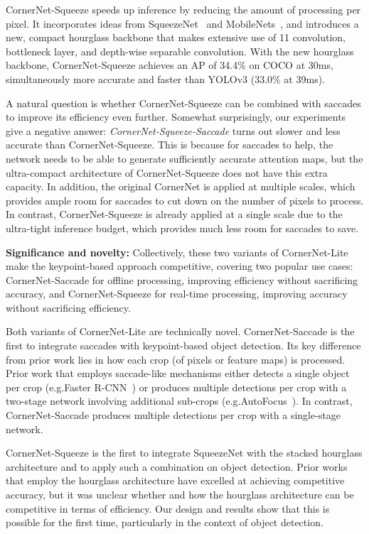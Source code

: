\documentclass{bmvc2k}
\begin{document}
CornerNet-Squeeze speeds up inference by reducing the amount of processing per pixel. It incorporates ideas from SqueezeNet~\cite{iandola2016squeezenet} and MobileNets~\cite{howard2017mobilenets}, and introduces a new, compact hourglass backbone that makes extensive use of 11 convolution, bottleneck layer, and depth-wise separable convolution. With the new hourglass backbone, CornerNet-Squeeze achieves an AP of 34.4\% on COCO at 30ms, simultaneously more accurate and faster than YOLOv3 (33.0\% at 39ms). 

A natural question is whether CornerNet-Squeeze can be combined with saccades to improve its efficiency even further. Somewhat surprisingly, our experiments give a negative answer: \emph{CornerNet-Squeeze-Saccade} turns out slower and less accurate than CornerNet-Squeeze. This is because for saccades to help, the network needs to be able to generate sufficiently accurate attention maps, but the ultra-compact architecture of CornerNet-Squeeze does not have this extra capacity. In addition, the original CornerNet is applied at multiple scales, which provides ample room for saccades to cut down on the number of pixels to process. In contrast, CornerNet-Squeeze is already applied at a single scale due to the ultra-tight inference budget, which provides much less room for saccades to save. 

\smallskip \noindent \textbf{Significance and novelty:} Collectively, these two variants of CornerNet-Lite make the keypoint-based approach competitive, covering two popular use cases: CornerNet-Saccade for offline processing, improving efficiency without sacrificing accuracy, and CornerNet-Squeeze for real-time processing, improving accuracy without sacrificing efficiency.

Both variants of CornerNet-Lite are technically novel. CornerNet-Saccade is the first to integrate saccades with keypoint-based object detection. Its key difference from prior work lies in how each crop (of pixels or feature maps) is processed. Prior work that employs saccade-like mechanisms either detects a single object per crop (e.g.\@ Faster R-CNN~\cite{ren2015faster}) or produces multiple detections per crop with a two-stage network involving additional sub-crops (e.g.\@ AutoFocus~\cite{najibi2018autofocus}). In contrast, CornerNet-Saccade produces multiple detections per crop with a single-stage network. 

CornerNet-Squeeze is the first to integrate SqueezeNet with the stacked hourglass architecture and to apply such a combination on object detection. Prior works that employ the hourglass architecture have excelled at achieving competitive accuracy, but it was unclear whether and how the hourglass architecture can be competitive in terms of efficiency. Our design and results show that this is possible for the first time, particularly in the context of object detection. 
\end{document}
